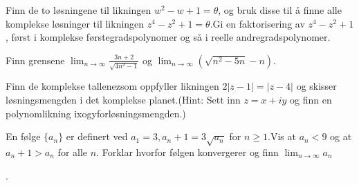 \documentclass{myassignment}
\begin{document}
	\begin{problem}
		Finn de to løsningene til likningen $w^2 - w + 1 = \theta$, og bruk disse til å finne alle komplekse løsninger til likningen $z^4 - z^2 + 1 = \theta$.Gi en faktorisering av $z^4 - z^2 + 1$, først i komplekse førstegradspolynomer og så i reelle andregradspolynomer.
	\end{problem}

	\begin{answer}

	\end{answer}


	\begin{problem}
		Finn grensene $\lim_{n \rightarrow \infty}\frac{3n + 2}{\sqrt{4n^2 - 1}}$ og $\lim_{n\rightarrow\infty}(\sqrt{n^2 - 5n} - n)$.
	\end{problem}

	\begin{answer}

	\end{answer}


	\begin{problem}
		Finn de komplekse tallenezsom oppfyller likningen $2|z - 1|=|z - 4|$ og skisser løsningsmengden i det komplekse planet.(Hint: Sett inn $z=x+iy$ og finn en polynomlikning ixogyforløsningsmengden.)
	\end{problem}

	\begin{answer}

	\end{answer}


	\begin{problem}
		En følge $\{ a_n \}$ er definert ved $a_1 = 3, a_n + 1 = 3\sqrt{a_n}$ for $n \geq 1$.Vis at $a_n < 9$ og at $a_n+1 > a_n$ for alle $n$. Forklar hvorfor følgen konvergerer og finn $\lim_{n \rightarrow \infty}{a_n}$
	\end{problem}

	\begin{answer}

	\end{answer}.
\end{document}
